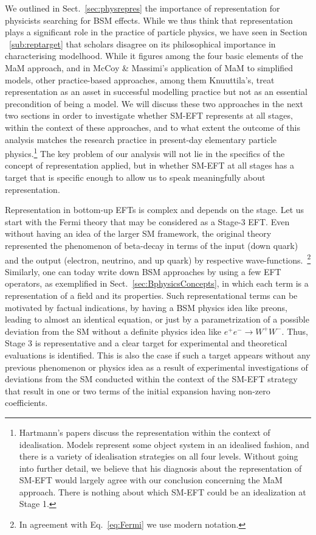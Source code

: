 We outlined in Sect.~\ref{sec:physrepres} the importance of representation for physicists searching for BSM effects. 
While we thus think that representation plays a significant role in the practice of particle physics, we have seen in Section ~\ref{sub:reptarget} that scholars disagree on its philosophical importance in characterising modelhood. 
While it figures among the four basic elements of the MaM approach, and in McCoy \& Massimi's application of MaM to simplified models, other practice-based approaches, among them Knuuttila's, treat representation as an asset in successful modelling practice but not as an essential precondition of being a model. 
We will discuss these two approaches in the next two sections in order to investigate whether SM-EFT represents at all stages, within the context of these approaches, and to what extent the outcome of this analysis matches the research practice in present-day elementary particle physics.\footnote{Hartmann's papers discuss the representation within the context of idealisation. Models represent some object system in an idealised fashion, and there is a variety of idealisation strategies on all four levels. Without going into further detail, we believe that his diagnosis about the representation of SM-EFT would largely agree with our conclusion concerning the MaM approach. There is nothing about which SM-EFT could be an idealization at Stage 1.}
The key problem of our analysis will not lie in the specifics of the concept of representation applied, but in whether SM-EFT at all stages has a target that is specific enough to allow us to speak meaningfully about representation.


Representation in bottom-up EFTs is complex and depends on the stage.
Let us start with the Fermi theory that may be considered as a Stage-3 EFT. 
Even without having an idea of the larger SM framework, the original theory represented the phenomenon of beta-decay in terms of the input (down quark) and the output (electron, neutrino, and up quark) by respective wave-functions.~\footnote{In agreement with Eq.~\ref{eq:Fermi} we use modern notation.}
Similarly, one can today write down BSM approaches by using a few EFT operators, as exemplified in Sect.~\ref{sec:BphysicsConcepts}, in which each term is a representation of a field and its properties.
Such representational terms can be motivated by factual indications, by having a BSM physics idea like preons, leading to almost an identical equation, or just by a parametrization of a possible deviation from the SM without a definite physics idea like $e^+e^-\rightarrow W^+W^-$.
Thus, Stage 3 is representative and a clear target for experimental and theoretical evaluations is identified.
This is also the case if such a target appears without any previous phenomenon or physics idea as a result of experimental investigations of deviations from the SM conducted within the context of the SM-EFT strategy that result in one or two terms of the initial expansion having non-zero coefficients.

